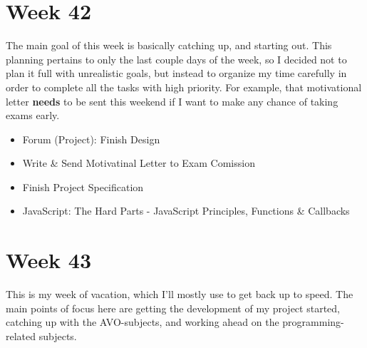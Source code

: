 \documentclass[12pt]{book}
\begin{document}
\section{Week 42}
The main goal of this week is basically catching up, and starting out.
This planning pertains to only the last couple days of the week, so I decided
not to plan it full with unrealistic goals, but instead to organize my time 
carefully in order to complete all the tasks with high priority.
For example, that motivational letter \textbf{needs} to be sent this weekend
if I want to make any chance of taking exams early.

\begin{itemize}
  \item Forum (Project): Finish Design
  \item Write \& Send Motivatinal Letter to Exam Comission
  \item Finish Project Specification
  \item JavaScript: The Hard Parts - JavaScript Principles, Functions \& Callbacks 
\end{itemize}

\section{Week 43}
This is my week of vacation, which I'll mostly use to get back up to speed.
The main points of focus here are getting the development of my project started,
catching up with the AVO-subjects, and working ahead on the programming-related subjects.
\end{document}
